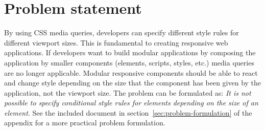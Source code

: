 \documentclass[a4paper,11pt]{kth-mag}
\begin{document}
    \section{Problem statement}
      By using \gls{CSS} \gls{media queries}, developers can specify different style rules for different \gls{viewport} sizes.
      This is fundamental to creating \gls{responsive} \gls{web} applications.
      If developers want to build modular applications by composing the application by smaller components (\glspl{element}, scripts, styles, etc.) \gls{media queries} are no longer applicable.
      Modular \gls{responsive} components should be able to react and change style depending on the size that the component has been given by the application, not the \gls{viewport} size.
      The problem can be formulated as: \emph{It is not possible to specify conditional style rules for \glspl{element} depending on the size of an element}.
      See the included document in section~\ref{sec:problem-formulation} of the appendix for a more practical problem formulation.
\end{document}
